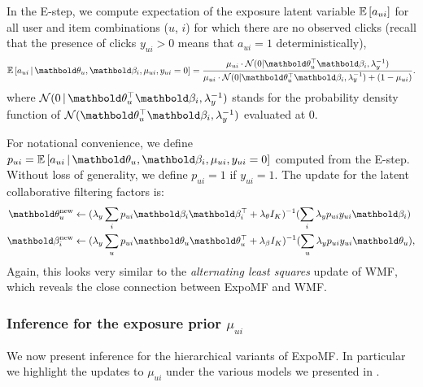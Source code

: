 In the E-step, we compute expectation of the exposure latent variable $\mathbb{E}\left[a_{ui}\right]$ for all user and item combinations ($u$, $i$) for which there are no observed clicks (recall that the presence of clicks $y_{ui}>0$ means that $a_{ui}=1$ deterministically),
\begin{equation}
\E{a_{ui} \g \mb\theta_u, \mb\beta_i, \mu_{ui}, y_{ui} = 0} = \frac{\mu_{ui} \cdot \mathcal{N}(0 | \mb\theta_u^\top\mb\beta_i, \lambda_y^{-1})}{\mu_{ui}\cdot \mathcal{N}(0 |  \mb\theta_u^\top \mb\beta_i, \lambda_y^{-1}) + (1 - \mu_{ui})}.
\label{eq:update_a}
\end{equation}
where $\mathcal{N}(0 \g \mb\theta_u^\top\mb\beta_i, \lambda_y^{-1})$ stands for the probability density function of $\mathcal{N}(\mb\theta_u^\top\mb\beta_i, \lambda_y^{-1})$ evaluated at $0$. 

For notational convenience, we define $p_{ui} = \E{a_{ui} \g \mb\theta_u, \mb\beta_i, \mu_{ui}, y_{ui} = 0}$ computed from the E-step. Without loss of generality, we define $p_{ui} = 1$ if $y_{ui} = 1$. The update for the latent collaborative filtering factors is:
\begin{align}
\mb\theta_u^\new &\leftarrow (\lambda_y \sum_i p_{ui} \mb\beta_i \mb\beta_i^\top +  \lambda_\theta I_K)^{-1} (\sum_i \lambda_y p_{ui} y_{ui} \mb\beta_i ) \label{eq:update_theta}\\
\mb\beta_i^\new &\leftarrow (\lambda_y \sum_u p_{ui} \mb\theta_u \mb\theta_u^\top + \lambda_\beta I_K)^{-1} (\sum_u \lambda_y p_{ui} {y}_{ui} \mb\theta_u), \label{eq:update_beta}
\end{align}
Again, this looks very similar to the \textit{alternating least squares} update of \gls{WMF}, which reveals the close connection between ExpoMF and \gls{WMF}.

\subsubsection{Inference for the exposure prior $\mu_{ui}$}
\label{sec:inf_hier_model}
We now present inference for the hierarchical variants of ExpoMF. 
In particular we highlight the updates to 
$\mu_{ui}$ under the various models we presented in .

